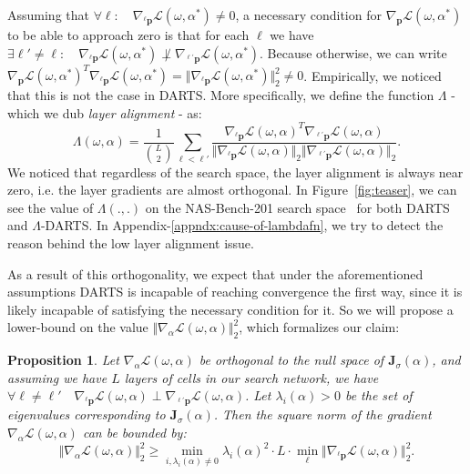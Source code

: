 \documentclass{article} \usepackage{fancyhdr, iclr2023_conference, times}
\def\vp{{\bm{p}}}
\def\mJ{{\bm{J}}}
\newcommand{\mydarts}{$\Lambda$-DARTS\xspace}
\newtheorem{prop}{Proposition}
\newcommand{\lambdafn}{layer alignment\xspace}
\begin{document}
Assuming that $\forall \ell:\quad \nabla_{{}^\ell \vp}\mathcal{L}(\omega, \alpha^*)\neq0$, a necessary condition for $\nabla_\vp\mathcal{L}(\omega, \alpha^*)$ to be able to approach zero is that for each $\ell$ we have $\exists {\ell'\neq \ell}:\quad \nabla_{{}^\ell \vp}\mathcal{L}(\omega, \alpha^*) \not\perp \nabla_{{}^{\ell'} \vp}\mathcal{L}(\omega, \alpha^*)$. Because otherwise, we can write $\nabla_\vp \mathcal{L}(\omega, \alpha^*)^T\nabla_{{}^\ell \vp}\mathcal{L}(\omega, \alpha^*)=\Vert \nabla_{{}^\ell \vp}\mathcal{L}(\omega, \alpha^*)\Vert_2^2\neq 0$. Empirically, we noticed that this is not the case in DARTS. More specifically, we define the function $\Lambda$ - which we dub \textit{\lambdafn} - as:
\begin{equation}
    \Lambda(\omega, \alpha)=\frac{1}{\binom{L}{2}} \sum_{\ell< \ell'} \frac{\nabla_{{}^\ell \vp}\mathcal{L}(\omega, \alpha)^T\nabla_{{}^{\ell'} \vp}\mathcal{L}(\omega, \alpha)}{\Vert \nabla_{{}^\ell \vp}\mathcal{L}(\omega, \alpha)\Vert_2 \Vert \nabla_{{}^{\ell'} \vp}\mathcal{L}(\omega, \alpha) \Vert_2}\text{.}
\end{equation}
We noticed that regardless of the search space, the \lambdafn is always near zero, i.e. the layer gradients are almost orthogonal. In Figure~\ref{fig:teaser}, we can see the value of $\Lambda(., .)$ on the NAS-Bench-201 search space~\citep{DBLP:conf/iclr/Dong020} for both DARTS and \mydarts. In Appendix-\ref{appndx:cause-of-lambdafn}, we try to detect the reason behind the low layer alignment issue.
\par As a result of this orthogonality, we expect that under the aforementioned assumptions DARTS is incapable of reaching convergence the first way, since it is likely incapable of satisfying the necessary condition for it. So we will propose a lower-bound on the value $\Vert \nabla_\alpha \mathcal{L}(\omega, \alpha)\Vert_2^2$, which formalizes our claim:
\begin{prop}
\label{prop:1}
Let $\nabla_\alpha \mathcal{L}(\omega, \alpha)$ be orthogonal to the null space of $\mJ_\sigma(\alpha)$, and assuming we have $L$ layers of cells in our search network, we have $\forall \ell\neq\ell'\quad \nabla_{{}^\ell \vp}\mathcal{L}(\omega, \alpha)\perp\nabla_{{}^{\ell'} \vp}\mathcal{L}(\omega, \alpha)$. Let $\lambda_i(\alpha)>0$ be the set of eigenvalues corresponding to $\mJ_\sigma(\alpha)$. Then the square norm of the gradient $\nabla_\alpha \mathcal{L}(\omega, \alpha)$ can be bounded by:
\begin{equation}
\label{eqn:prop}
    \Vert \nabla_\alpha \mathcal{L}(\omega, \alpha)\Vert_2^2\geq \min_{i, \lambda_i(\alpha)\neq 0} \lambda_i(\alpha)^2\cdot L\cdot \min_\ell \Vert \nabla_{{}^\ell \vp}\mathcal{L}(\omega, \alpha)\Vert_2^2.
\end{equation}
\end{prop}
\end{document}
